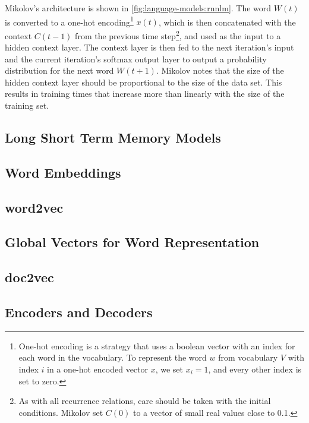 Mikolov's architecture is shown in \autoref{fig:language-models:rnnlm}.
The word $W(t)$ is converted to a one-hot encoding\footnote{One-hot encoding is a strategy that uses a boolean vector with an index for each word in the vocabulary.
To represent the word $w$ from vocabulary $V$ with index $i$ in a one-hot encoded vector $x$, we set $x_i = 1$, and every other index is set to zero.}
$x(t)$, which is then concatenated with the context $C(t-1)$ from the previous time step\footnote{As with all recurrence relations, care should be taken with the initial conditions.
Mikolov set $C(0)$ to a vector of small real values close to 0.1.},
and used as the input to a hidden context layer.
The context layer is then fed to the next iteration's input and the current iteration's softmax output layer to output a probability distribution for the next word $W(t+1)$.
Mikolov notes that the size of the hidden context layer should be proportional to the size of the data set.
This results in training times that increase more than linearly with the size of the training set.

\subsection{Long Short Term Memory Models}\label{sec:language-models:lstms}


\subsection{Word Embeddings}\label{sec:language-models:word-embeddings}
\subsection{word2vec}\label{sec:language-models:word2vec}
\subsection{Global Vectors for Word Representation}\label{sec:language-models:glove}
\subsection{doc2vec}\label{sec:language-models:doc2vec}

\subsection{Encoders and Decoders}\label{sec:language-models:encoders-decoders}
